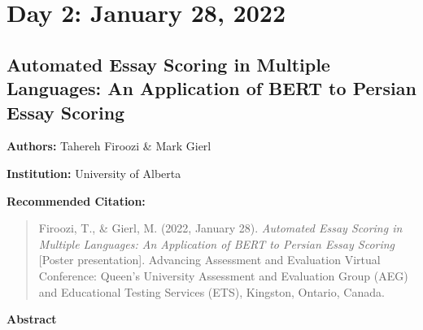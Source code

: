 \documentclass[
]{book}
\begin{document}
\newpage

\hypertarget{day-2-january-28-2022}{%
\section{Day 2: January 28, 2022}\label{day-2-january-28-2022}}

\hypertarget{automated-essay-scoring-in-multiple-languages-an-application-of-bert-to-persian-essay-scoring}{%
\subsection{Automated Essay Scoring in Multiple Languages: An Application of BERT to Persian Essay Scoring}\label{automated-essay-scoring-in-multiple-languages-an-application-of-bert-to-persian-essay-scoring}}

\textbf{Authors:} Tahereh Firoozi \& Mark Gierl

\textbf{Institution:} University of Alberta

\textbf{Recommended Citation:}

\begin{quote}
Firoozi, T., \& Gierl, M. (2022, January 28). \emph{Automated Essay Scoring in Multiple Languages: An Application of BERT to Persian Essay Scoring} {[}Poster presentation{]}. Advancing Assessment and Evaluation Virtual Conference: Queen's University Assessment and Evaluation Group (AEG) and Educational Testing Services (ETS), Kingston, Ontario, Canada.
\end{quote}

\textbf{Abstract}
\end{document}
